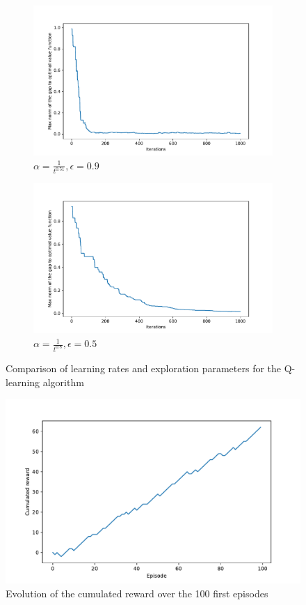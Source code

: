 \documentclass[11pt, oneside]{article}   	%
\begin{document}
\begin{figure}
\begin{subfigure}{.48\textwidth}
  \centering
  \includegraphics[width=\linewidth]{q_learninge09}
  \caption{$\alpha = \frac{1}{t^{0.51}}, \epsilon = 0.9$}
\end{subfigure}
\begin{subfigure}{.48\textwidth}
  \centering
  \includegraphics[width=\linewidth]{q_learning08}
  \caption{$\alpha = \frac{1}{t^{0.8}}, \epsilon = 0.5$}
\end{subfigure}
\caption{Comparison of learning rates and exploration parameters for the Q-learning algorithm}

\end{figure}

\begin{figure}[h!]
\begin{center}
\includegraphics[width=.7\linewidth]{rewards.pdf}
\caption{Evolution of the cumulated reward over the 100 first episodes}
\label{default}
\end{center}
\end{figure}
\end{document}

